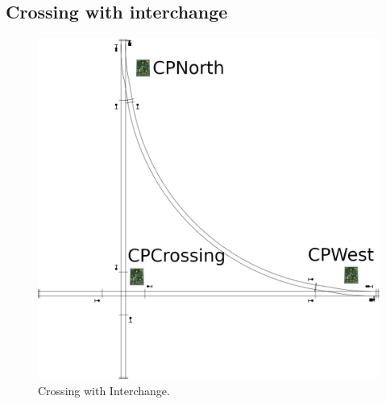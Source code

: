 %
%
%
%
% 
%
%
%
%
%
% 
%

\subsection{Crossing with interchange}
\label{sect-appl:crossinginterchange}

\begin{figure}[hbpt]\begin{centering}%
\includegraphics[width=5in]{CrossingInterchange.png}
\caption{Crossing with Interchange.}
\label{fig:CrossingInterchange}
\end{centering}\end{figure}


